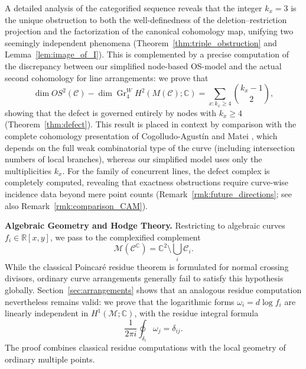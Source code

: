 \documentclass[article,11pt]{amsart} \numberwithin{equation}{section}
\numberwithin{equation}{section}
\begin{document}
{A detailed analysis of the categorified sequence reveals that the integer $k_x=3$ is the unique obstruction to both the well-definedness of the deletion--restriction projection and the factorization of the canonical cohomology map, unifying two seemingly independent phenomena (Theorem~\ref{thm:triple_obstruction} and Lemma~\ref{lem:image_of_I}). This is complemented by a precise computation of the discrepancy between our simplified node-based OS-model and the actual second cohomology for line arrangements: we prove that
\[
\dim OS^2(\mathcal C)-\dim \operatorname{Gr}^W_4 H^2(M(\mathcal C);\mathbb C)
=
\sum_{x: k_x\ge 4}\binom{k_x-1}{2},
\]
showing that the defect is governed entirely by nodes with $k_x\ge4$ (Theorem~\ref{thm:defect}). This result is placed in context by comparison with the complete cohomology presentation of Cogolludo-Agust\'in and Matei \cite{CogolludoMatei2012}, which depends on the full weak combinatorial type of the curve (including intersection numbers of local branches), whereas our simplified model uses only the multiplicities $k_x$. For the family of concurrent lines, the defect complex is completely computed, revealing that exactness obstructions require curve-wise incidence data beyond mere point counts (Remark~\ref{rmk:future_directions}; see also Remark~\ref{rmk:comparison_CAM}).

\medskip
\noindent\textbf{Algebraic Geometry and Hodge Theory.}
Restricting to algebraic curves $f_i\in\mathbb R[x,y]$, we pass to the complexified complement
\[
\mathcal M(\mathcal C^{\mathbb C})=\mathbb C^2\setminus\bigcup_i\mathscr C_i.
\]
While the classical Poincar\'e residue theorem is formulated for normal crossing divisors, ordinary curve arrangements generally fail to satisfy this hypothesis globally. Section~\ref{sec:arrangements} shows that an analogous residue computation nevertheless remains valid: we prove that the logarithmic forms $\omega_i=d\log f_i$ are linearly independent in $H^1(\mathcal M;\mathbb C)$, with the residue integral formula
\[
\frac{1}{2\pi i}\oint_{\delta_i}\omega_j=\delta_{ij}.
\]
The proof combines classical residue computations with the local geometry of ordinary multiple points.

}
\end{document}
